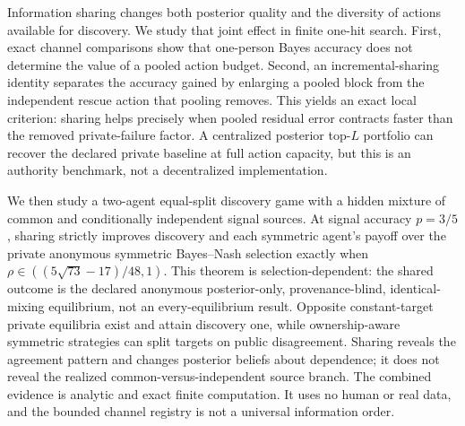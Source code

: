 Information sharing changes both posterior quality and the diversity of actions
available for discovery. We study that joint effect in finite one-hit search.
First, exact channel comparisons show that one-person Bayes accuracy does not
determine the value of a pooled action budget. Second, an incremental-sharing
identity separates the accuracy gained by enlarging a pooled block from the
independent rescue action that pooling removes. This yields an exact local
criterion: sharing helps precisely when pooled residual error contracts faster
than the removed private-failure factor. A centralized posterior top-$L$
portfolio can recover the declared private baseline at full action capacity,
but this is an authority benchmark, not a decentralized implementation.

We then study a two-agent equal-split discovery game with a hidden mixture of
common and conditionally independent signal sources. At signal accuracy
$p=3/5$, sharing strictly improves discovery and each symmetric agent's payoff
over the private anonymous symmetric Bayes--Nash selection exactly when
$\rho\in((5\sqrt{73}-17)/48,1)$. This theorem is selection-dependent: the
shared outcome is the declared anonymous posterior-only, provenance-blind,
identical-mixing equilibrium, not an every-equilibrium result. Opposite
constant-target private equilibria exist and attain discovery one, while
ownership-aware symmetric strategies can split targets on public disagreement.
Sharing reveals the agreement pattern and changes posterior beliefs about
dependence; it does not reveal the realized common-versus-independent source
branch. The combined evidence is analytic and exact finite computation. It
uses no human or real data, and the bounded channel registry is not a universal
information order.
